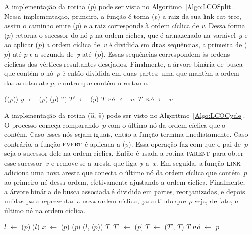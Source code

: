A implementação da rotina \LCOSplit($p$) pode ser vista no Algoritmo~\ref{Algo:LCOSplit}.
Nessa implementação, primeiro, a função \linkcutEvert{} é torna \treapLast($p$) a raiz da sua link cut tree, assim o caminho entre \treapFirst($p$) e a raiz corresponde à ordem cíclica de $v$.
Dessa forma \linkcutParent($p$) retorna o sucessor do nó $p$ na ordem cíclica, que é armazenado na variável~$y$ e ao aplicar \linkcutDelEdge($p$) a ordem cíclica de~$v$ é dividida em duas sequências, a primeira de \treapFirst($p$) até $p$ e a segunda de~$y$ até~\treapLast($p$).
Essas sequências correspondem às ordens cíclicas dos vértices resultantes desejados.
Finalmente, a árvore binária de busca que contém o nó~$p$ é então dividida em duas partes: uma que mantém a ordem das arestas até $p$, e outra que contém o restante.

\begin{algorithm}[htb]
\caption{\LCOSplit($p$)}
\label{Algo:LCOSplit}
\begin{algorithmic}[1]
\State \linkcutEvert(\treapLast($p$))
\State $y$ $\gets$ \linkcutParent($p$)
\State \linkcutDelEdge($p$)
\State $T$, $T'$ $\gets$ \treapSplitRight($p$)
\State $T$.$\mathit{n\acute{o}}$ $\gets$ $w$
\State $T'$.$\mathit{n\acute{o}}$ $\gets$ $v$
\end{algorithmic}
\end{algorithm}


A implementação da rotina \LCOCycle($\hat u$, $\hat e$) pode ser visto no Algoritmo~\ref{Algo:LCOCycle}.
O processo começa comparando~$p$ com o último nó da ordem cíclica que o contém.
Caso esses nós sejam iguais, então a função termina imediatamente.
Caso contrário, a função $\text{\scshape \text{\scshape evert}}$ é aplicada a \treapLast($p$).
Essa operação faz com que o pai de~$p$ seja o sucessor dele na ordem cíclica.
Então é usada a rotina $\text{\scshape \text{\scshape parent}}$ para obter esse sucessor~$x$ e remove-se a aresta que liga~$p$ a~$x$.
Em seguida, a função $\text{\scshape link}$ adiciona uma nova aresta que conecta o último nó da ordem cíclica que contém~$p$ ao primeiro nó dessa ordem, efetivamente ajustando a ordem cíclica.
Finalmente, a árvore binária de busca associada é dividida em partes, reorganizadas, e depois unidas para representar a nova ordem cíclica, garantindo que~$p$ seja, de fato, o último nó na ordem cíclica.


\begin{algorithm}[htb]
\caption{\LCOCycle($p$)}
\label{Algo:LCOCycle}
\begin{algorithmic}[1]
\State $l$ $\gets$ \treapLast($p$)
\State\Return
\EndIf
\State \linkcutEvert($l$)
\State $x$ $\gets$ \linkcutParent($p$)
\State \linkcutDelEdge($p$)
\State \linkcutAddEdge($l$, \treapFirst($p$))
\State $T$, $T'$ $\gets$ \treapSplitRight($p$)
\State $T$ $\gets$ \treapJoin($T'$, $T$)
\State $T$.$\mathit{n\acute{o}}$ $\gets$ $p$
\end{algorithmic}
\end{algorithm}
